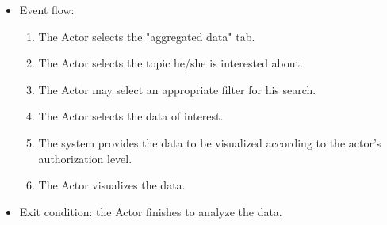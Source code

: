 \begin{itemize}
\begin{itemize}
            \item Event flow:
            \begin{enumerate}
                \item The Actor selects the "aggregated data" tab.
                \item The Actor selects the topic he/she is interested about.
                \item The Actor may select an appropriate filter for his search.
                \item The Actor selects the data of interest.
                \item The system provides the data to be visualized according to the actor's authorization level.
                \item The Actor visualizes the data.
            \end{enumerate}
            \item Exit condition: the Actor finishes to analyze the data.
        \end{itemize}
    \end{itemize}